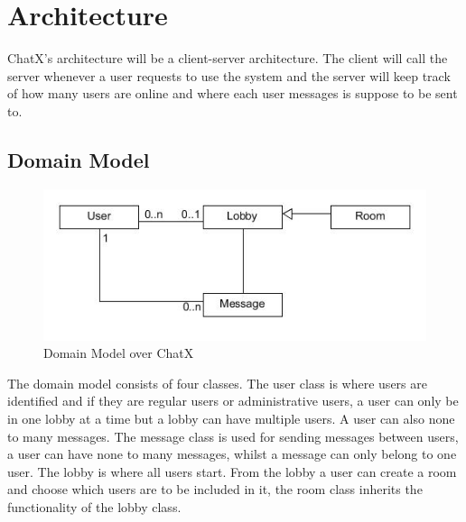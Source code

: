 \section{Architecture}
ChatX's architecture will be a client-server architecture. The client will call the server whenever a user requests to use the system and the server will keep track of how many users are online and where each user messages is suppose to be sent to.

\subsection{Domain Model}

\begin{figure}[H]
\centering
\includegraphics[width=0.7\linewidth]{img/DomainModelChatX}
\caption{Domain Model over ChatX}
\label{fig:DomainModelChatX}
\end{figure}

The domain model consists of four classes. The user class is where users are identified and if they are regular users or administrative users, a user can only be in one lobby at a time but a lobby can have multiple users. A user can also none to many messages. The message class is used for sending messages between users, a user can have none to many messages, whilst a message can only belong to one user. The lobby is where all users start. From the lobby a user can create a room and choose which users are to be included in it, the room class inherits the functionality of the lobby class.
